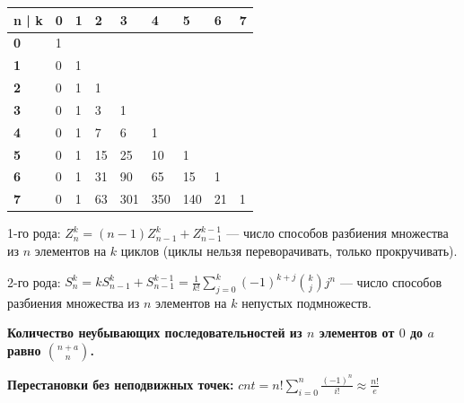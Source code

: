 \begin{center}
    \begin{tabular}{|l|l|l|l|l|l|l|l|l|} \hline
        n | k      & \textbf{0} & \textbf{1} & \textbf{2} & \textbf{3} & \textbf{4} & \textbf{5} & \textbf{6} & \textbf{7} \\ \hline
        \textbf{0} & 1          &            &            &            &            &            &            &            \\ \hline
        \textbf{1} & 0          & 1          &            &            &            &            &            &            \\ \hline
        \textbf{2} & 0          & 1          & 1          &            &            &            &            &            \\ \hline
        \textbf{3} & 0          & 1          & 3          & 1          &            &            &            &            \\ \hline
        \textbf{4} & 0          & 1          & 7          & 6          & 1          &            &            &            \\ \hline
        \textbf{5} & 0          & 1          & 15         & 25         & 10         & 1          &            &            \\ \hline
        \textbf{6} & 0          & 1          & 31         & 90         & 65         & 15         & 1          &            \\ \hline
        \textbf{7} & 0          & 1          & 63         & 301        & 350        & 140        & 21         & 1          \\ \hline
    \end{tabular}
\end{center}

1-го рода: $Z_n^k =(n-1)Z_{n - 1}^k + Z_{n-1}^{k-1}$ --- число способов разбиения множества из $n$ элементов на $k$ циклов (циклы нельзя переворачивать, только прокручивать).

2-го рода: $S_n^k = kS_{n - 1}^k + S_{n-1}^{k-1} = \frac1{k!} \sum\limits_{j=0}^k (-1)^{k+j}\binom{k}{j}j^n$ --- число способов разбиения множества из $n$ элементов на $k$ непустых подмножеств.

\textbf{Количество неубывающих последовательностей из $n$ элементов от $0$ до $a$ равно $\binom{n + a}{n}$.}

\textbf{Перестановки без неподвижных точек:} $cnt = n! \sum\limits_{i = 0}^n \frac{(-1)^n}{i!} \approx \frac{n!}e$




